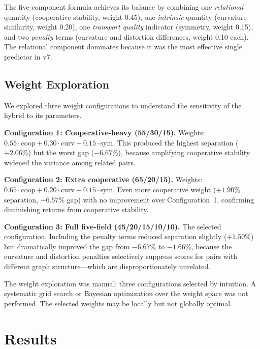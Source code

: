 \documentclass{../yalumba}
\begin{document}
\begin{keyfinding}
The five-component formula achieves its balance by combining one
\emph{relational} quantity (cooperative stability, weight 0.45), one
\emph{intrinsic} quantity (curvature similarity, weight 0.20), one
\emph{transport quality} indicator (symmetry, weight 0.15), and two
\emph{penalty} terms (curvature and distortion differences, weight
0.10 each).  The relational component dominates because it was the
most effective single predictor in v7.
\end{keyfinding}

\subsection{Weight Exploration}

We explored three weight configurations to understand the
sensitivity of the hybrid to its parameters.

\textbf{Configuration 1: Cooperative-heavy (55/30/15).}
Weights: $0.55 \cdot \text{coop} + 0.30 \cdot \text{curv} + 0.15 \cdot
\text{sym}$.  This produced the highest separation ($+2.06\%$) but the
worst gap ($-6.67\%$), because amplifying cooperative stability widened
the variance among related pairs.

\textbf{Configuration 2: Extra cooperative (65/20/15).}
Weights: $0.65 \cdot \text{coop} + 0.20 \cdot \text{curv} + 0.15 \cdot
\text{sym}$.  Even more cooperative weight ($+1.90\%$ separation,
$-6.57\%$ gap) with no improvement over Configuration~1, confirming
diminishing returns from cooperative stability.

\textbf{Configuration 3: Full five-field (45/20/15/10/10).}
The selected configuration.  Including the penalty terms reduced
separation slightly ($+1.50\%$) but dramatically improved the gap
from $-6.67\%$ to $-1.66\%$, because the curvature and distortion
penalties selectively suppress scores for pairs with different graph
structure---which are disproportionately unrelated.

\begin{limitation}
The weight exploration was manual: three configurations selected by
intuition.  A systematic grid search or Bayesian optimization over the
weight space was not performed.  The selected weights may be locally
but not globally optimal.
\end{limitation}


\section{Results}
\label{sec:results}
\end{document}
